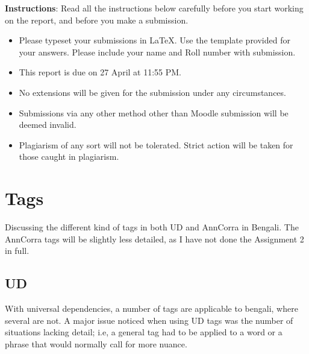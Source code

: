 \documentclass[a4 paper]{article}
\begin{document}

\textbf{Instructions}: Read all the instructions below carefully before you start working on the report, and before you make a submission.
\begin{itemize}
    \item Please typeset your submissions in \LaTeX. Use the template provided for your answers. Please include your name and Roll number with submission. 
    \item This report is due on 27 April at 11:55 PM.
    \item No extensions will be given for the submission under any circumstances.
    \item Submissions via any other method other than Moodle submission will be deemed invalid.
    \item Plagiarism of any sort will not be tolerated. Strict action will be taken for those caught in plagiarism.
\end{itemize}

\section{Tags}

Discussing the different kind of tags in both UD and AnnCorra in Bengali. The 
AnnCorra tags will be slightly less detailed, as I have not done the Assignment
2 in full.

\subsection{UD}

With universal dependencies, a number of tags are applicable to bengali, where
several are not. A major issue noticed when using UD tags was the number of
situations lacking detail; i.e, a general tag had to be applied to a word or 
a phrase that would normally call for more nuance.
\end{document}
